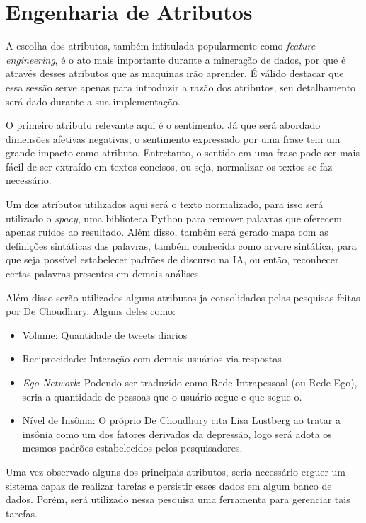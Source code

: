 \section{Engenharia de Atributos}
A escolha dos atributos, também intitulada popularmente como \textit{feature engineering}, é o ato mais importante durante a mineração de dados, por que é através desses atributos que as maquinas irão aprender. É válido destacar que essa sessão serve apenas para introduzir a razão dos atributos, seu detalhamento será dado durante a sua implementação.

O primeiro atributo relevante aqui é o sentimento. Já que será abordado dimensões afetivas negativas, o sentimento expressado por uma frase tem um grande impacto como atributo. Entretanto, o sentido em uma frase pode ser mais fácil de ser extraído em textos concisos, ou seja, normalizar os textos se faz necessário.

Um dos atributos utilizados aqui será o texto normalizado, para isso será utilizado o \textit{spacy}, uma biblioteca Python para remover palavras que oferecem apenas ruídos ao resultado. Além disso, também será gerado mapa com as definições sintáticas das palavras, também conhecida como arvore sintática, para que seja possível estabelecer padrões de discurso na IA, ou então, reconhecer certas palavras presentes em demais análises.

Além disso serão utilizados alguns atributos ja consolidados pelas pesquisas feitas por De Choudhury\cite{de2013social, de2013predicting}. Alguns deles como:
\begin{itemize}
 \item Volume: Quantidade de tweets diarios
 \item Reciprocidade: Interação com demais usuários via respostas
 \item \textit{Ego-Network}: Podendo ser traduzido como Rede-Intrapessoal (ou Rede Ego), seria a quantidade de pessoas que o usuário segue e que segue-o.
 \item Nível de Insônia: O próprio De Choudhury cita Lisa Lustberg \cite{lustberg2000depression} ao tratar a insônia como um dos fatores derivados da depressão, logo será adota os mesmos padrões estabelecidos pelos pesquisadores.
\end{itemize}

Uma vez observado alguns dos principais atributos, seria necessário erguer um sistema capaz de realizar tarefas e persistir esses dados em algum banco de dados. Porém, será utilizado nessa pesquisa uma ferramenta para gerenciar tais tarefas.
